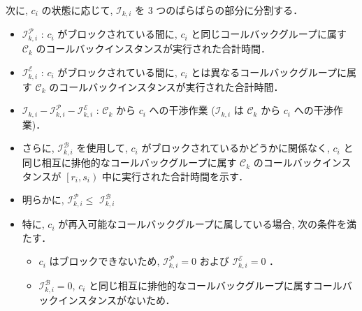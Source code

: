 \begin{frame}{}
    次に, $c_{i}$ の状態に応じて, $\mathcal{I}_{k, i}$ を 3 つのばらばらの部分に分割する．
    \begin{itemize}
        \item  $\mathcal{I}_{k, i}^{\mathcal{P}}$ : $c_{i}$ がブロックされている間に, $c_{i}$ と同じコールバックグループに属す $\mathcal{C}_{k}$ のコールバックインスタンスが実行された合計時間．

        \item  $\mathcal{I}_{k, i}^{\mathcal{E}}$ : $c_{i}$ がブロックされている間に, $c_{i}$ とは異なるコールバックグループに属す $\mathcal{C}_{k}$ のコールバックインスタンスが実行された合計時間．

        \item  $\mathcal{I}_{k, i}-\mathcal{I}_{k, i}^{\mathcal{P}}-\mathcal{I}_{k, i}^{\mathcal{E}}$ : $\mathcal{C}_{k}$ から $c_{i}$ への干渉作業 ($\mathcal{I}_{k, i}$ は $\mathcal{C}_{k}$ から $c_{i}$ への干渉作業)．
    \end{itemize}
\end{frame}

\begin{frame}{}
    \begin{itemize}
        \item さらに, $\mathcal{I}_{k, i}^{\mathcal{B}}$ を使用して, $c_{i}$ がブロックされているかどうかに関係なく, $c_{i}$ と同じ相互に排他的なコールバックグループに属す $\mathcal{C}_{k}$ のコールバックインスタンスが $\left[r_{i}, s_{i}\right)$ 中に実行された合計時間を示す．
        \item 明らかに, $\mathcal{I}_{k, i}^{\mathcal{P}} \leq$  $\mathcal{I}_{k, i}^{\mathcal{B}}$
        \item 特に, $c_{i}$ が再入可能なコールバックグループに属している場合, 次の条件を満たす．

              \begin{itemize}
                  \item  $c_{i}$ はブロックできないため, $\mathcal{I}_{k, i}^{\mathcal{P}}=0$ および $\mathcal{I}_{k, i}^{\mathcal{E}}=0$ ．

                  \item  $\mathcal{I}_{k, i}^{\mathcal{B}}=0$, $c_{i}$ と同じ相互に排他的なコールバックグループに属すコールバックインスタンスがないため．

              \end{itemize}
    \end{itemize}
\end{frame}

